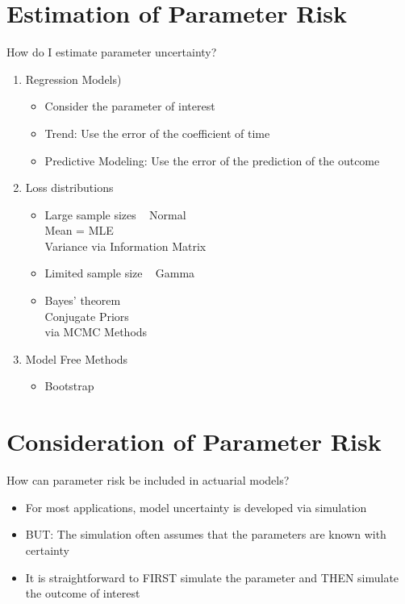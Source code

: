 \documentclass[10pt, xcolor=x11names,compress]{beamer}
\begin{document}
\section{Estimation of Parameter Risk}
\begin{frame}{How do I estimate parameter uncertainty?}
	\begin{enumerate}
		\item<1-> Regression Models)
		\begin{itemize}
			\item<1-> Consider the parameter of interest
			\item<1-> Trend: Use the error of the coefficient of time
			\item<1-> Predictive Modeling: Use the error of the prediction of the outcome
		\end{itemize}
		
		\item<2-> Loss distributions
		\begin{itemize}
			\item<2-> Large sample sizes ~ Normal\\
				Mean = MLE\\
				Variance via Information Matrix		
			\item<2-> Limited sample size ~ Gamma
			\item<2-> Bayes' theorem\\
				Conjugate Priors\\
				via MCMC Methods
		\end{itemize}	

		\item<3-> Model Free Methods
		\begin{itemize}
			\item<3-> Bootstrap
		\end{itemize}		
	\end{enumerate}
\end{frame}

\section{Consideration of Parameter Risk}
\begin{frame}{How can parameter risk be included in actuarial models?}
	\begin{itemize}
		\item<1-> For most applications, model uncertainty is developed via simulation
		\item<2-> BUT: The simulation often assumes that the parameters are known with certainty
		\item<3-> It is straightforward to FIRST simulate the parameter and THEN simulate the outcome of interest
	\end{itemize}
\end{frame}
\end{document}
